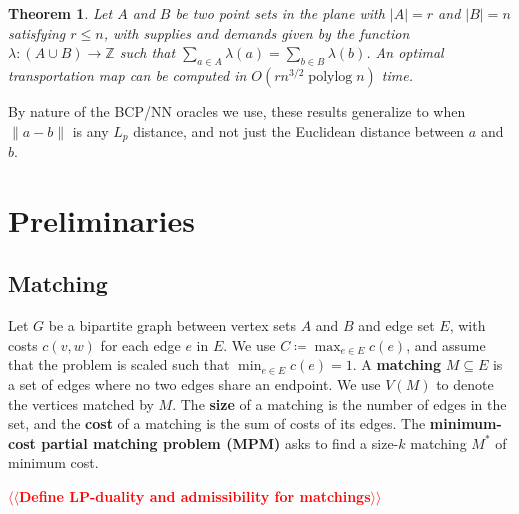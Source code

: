 \documentclass[11pt]{article}
\makeatletter
\def\polylog{\mathop{\mathrm{polylog}}}
\def\ints{\mathbb{Z}}
\def\tsupply{\lambda}
\theoremstyle{plain}
\newtheorem{theorem}[lemma]{Theorem}
\numberwithin{figure}{section}
\def\EMPH#1{\textbf{\boldmath #1}}
\def\n@te#1{\textsf{\boldmath \textbf{$\langle\!\langle$#1$\rangle\!\rangle$}}\leavevmode}
\def\note#1{\textcolor{red}{\n@te{#1}}}
\makeatother
\begin{document}
\begin{theorem}
\label{theorem:orlin}
Let $A$ and $B$ be two point sets in the plane with $|A| = r$ and $|B| = n$
satisfying $r \le n$, with supplies and demands given by the function
$\tsupply: (A \cup B) \to \ints$ such that
$\sum_{a \in A} \tsupply(a) = \sum_{b \in B} \tsupply(b)$.
An optimal transportation map can be computed in $O(rn^{3/2}\polylog n)$ time.
\end{theorem}



By nature of the BCP/NN oracles we use, these results generalize to when
$\|a - b\|$ is any $L_p$ distance, and not just the Euclidean distance between
$a$ and $b$.


\section{Preliminaries}
\label{section:prelim}

\subsection{Matching}

Let $G$ be a bipartite graph between vertex sets $A$ and $B$ and edge set $E$,
with costs $c(v, w)$ for each edge $e$ in $E$.
We use $C \coloneqq \max_{e \in E} c(e)$, and assume that the problem is scaled such
that $\min_{e \in E} c(e) = 1$.
A \EMPH{matching} $M \subseteq E$ is a set of edges where no two edges share an
endpoint.
We use $V(M)$ to denote the vertices matched by $M$.
The \EMPH{size} of a matching is the number of edges in the set, and the
\EMPH{cost} of a matching is the sum of costs of its edges.
The \EMPH{minimum-cost partial matching problem (MPM)} asks to find a size-$k$
matching $M^*$ of minimum cost.

\note{Define LP-duality and admissibility for matchings}
\end{document}

